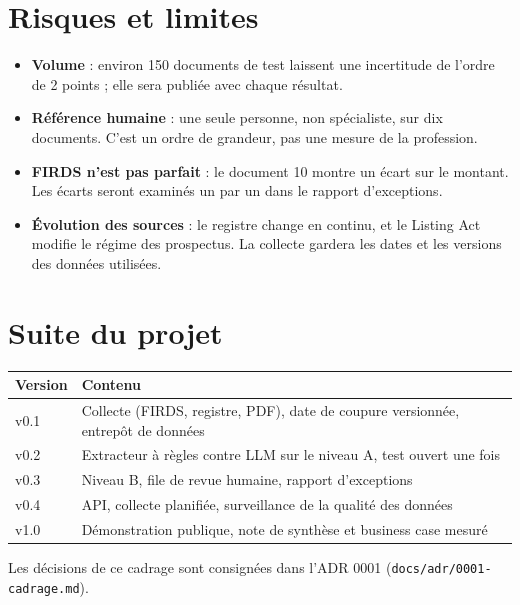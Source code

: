 \documentclass[11pt,a4paper]{article}
\begin{document}
\section{Risques et limites}

\begin{itemize}
  \item \textbf{Volume} : environ 150 documents de test laissent une incertitude de l'ordre de 2 points ; elle sera publiée avec chaque résultat.
  \item \textbf{Référence humaine} : une seule personne, non spécialiste, sur dix documents. C'est un ordre de grandeur, pas une mesure de la profession.
  \item \textbf{FIRDS n'est pas parfait} : le document 10 montre un écart sur le montant. Les écarts seront examinés un par un dans le rapport d'exceptions.
  \item \textbf{Évolution des sources} : le registre change en continu, et le Listing Act modifie le régime des prospectus. La collecte gardera les dates et les versions des données utilisées.
\end{itemize}

\section{Suite du projet}

\begin{table}[H]
\small
\begin{tabularx}{\linewidth}{lY}
\toprule
\textbf{Version} & \textbf{Contenu} \\
\midrule
v0.1 & Collecte (FIRDS, registre, PDF), date de coupure versionnée, entrepôt de données \\
v0.2 & Extracteur à règles contre LLM sur le niveau A, test ouvert une fois \\
v0.3 & Niveau B, file de revue humaine, rapport d'exceptions \\
v0.4 & API, collecte planifiée, surveillance de la qualité des données \\
v1.0 & Démonstration publique, note de synthèse et business case mesuré \\
\bottomrule
\end{tabularx}
\end{table}

Les décisions de ce cadrage sont consignées dans l'ADR 0001 (\texttt{docs/adr/0001-cadrage.md}).
\end{document}
